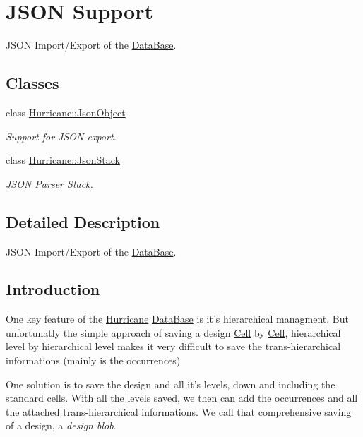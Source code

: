 \hypertarget{group__JsonSupport}{\section{J\-S\-O\-N Support}
\label{group__JsonSupport}
}


J\-S\-O\-N Import/\-Export of the \hyperlink{classHurricane_1_1DataBase}{Data\-Base}.  


\subsection*{Classes}
\begin{DoxyCompactItemize}
\item 
class \hyperlink{classHurricane_1_1JsonObject}{Hurricane\-::\-Json\-Object}
\begin{DoxyCompactList}\small\item\em Support for J\-S\-O\-N export. \end{DoxyCompactList}\item 
class \hyperlink{classHurricane_1_1JsonStack}{Hurricane\-::\-Json\-Stack}
\begin{DoxyCompactList}\small\item\em J\-S\-O\-N Parser Stack. \end{DoxyCompactList}\end{DoxyCompactItemize}


\subsection{Detailed Description}
J\-S\-O\-N Import/\-Export of the \hyperlink{classHurricane_1_1DataBase}{Data\-Base}. \hypertarget{group__JsonSupport_secJsonSupportIntro}{}\subsection{Introduction}\label{group__JsonSupport_secJsonSupportIntro}
One key feature of the \hyperlink{namespaceHurricane}{Hurricane} \hyperlink{classHurricane_1_1DataBase}{Data\-Base} is it's hierarchical managment. But unfortunatly the simple approach of saving a design \hyperlink{classHurricane_1_1Cell}{Cell} by \hyperlink{classHurricane_1_1Cell}{Cell}, hierarchical level by hierarchical level makes it very difficult to save the trans-\/hierarchical informations (mainly is the occurrences)

One solution is to save the design and all it's levels, down and including the standard cells. With all the levels saved, we then can add the occurrences and all the attached trans-\/hierarchical informations. We call that comprehensive saving of a design, a {\itshape design blob}.


